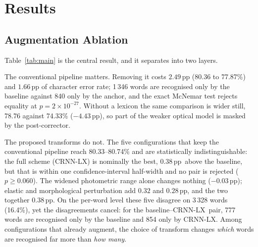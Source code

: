 \documentclass[conference]{IEEEtran}
\newcommand{\ours}{CRNN-LX}            %
\newcommand{\deltawa}{0.38\,pp}
\begin{document}
\section{Results}
\label{sec:results}

\subsection{Augmentation Ablation}
\label{sec:res-aug}

Table~\ref{tab:main} is the central result, and it separates into two
layers.

The conventional pipeline matters. Removing it costs $2.49$\,pp
(80.36 to 77.87\%) and $1.66$\,pp of character error rate; 1\,346
words are recognised only by the baseline against 840 only by the
anchor, and the exact McNemar test rejects equality at
$p=2\times10^{-27}$. Without a lexicon the same comparison is wider
still, 78.76 against 74.33\% ($-4.43$\,pp), so part of the weaker
optical model is masked by the post-corrector.

The proposed transforms do not. The five configurations that keep the
conventional pipeline reach 80.33--80.74\% and are statistically
indistinguishable: the full scheme (\ours) is nominally the best,
\deltawa\ above the baseline, but that is within one
confidence-interval half-width and no pair is rejected
($p\ge0.060$). The widened photometric range alone changes nothing
($-0.03$\,pp); elastic and morphological perturbation add $0.32$ and
$0.28$\,pp, and the two together $0.38$\,pp. On the per-word level
these five disagree on 3\,328 words (16.4\%), yet the disagreements
cancel: for the baseline--\ours\ pair, 777 words are recognised only
by the baseline and 854 only by \ours. Among configurations that
already augment, the choice of transform changes \emph{which} words are
recognised far more than \emph{how many}.
\end{document}
